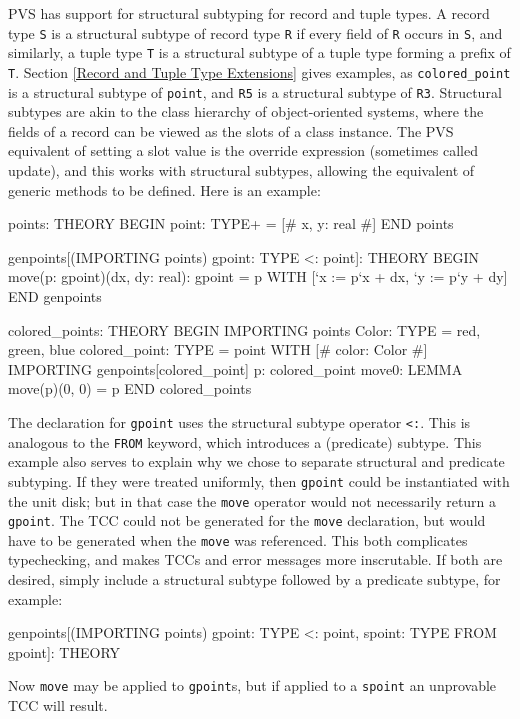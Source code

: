 PVS has support for structural subtyping for record and tuple types.  A
record type \texttt{S} is a structural subtype of record type \texttt{R}
if every field of \texttt{R} occurs in \texttt{S}, and similarly, a tuple
type \texttt{T} is a structural subtype of a tuple type forming a prefix
of \texttt{T}.  Section \ref{Record and Tuple Type Extensions} gives
examples, as \texttt{colored\_point} is a structural subtype of
\texttt{point}, and \texttt{R5} is a structural subtype of \texttt{R3}.
Structural subtypes are akin to the class hierarchy of object-oriented
systems, where the fields of a record can be viewed as the slots of a
class instance.  The PVS equivalent of setting a slot value is the
override expression (sometimes called update), and this works with
structural subtypes, allowing the equivalent of generic methods to be
defined.  Here is an example:
\begin{pvsex}
points: THEORY
BEGIN
 point: TYPE+ = [# x, y: real #]
END points

genpoints[(IMPORTING points) gpoint: TYPE <: point]: THEORY
BEGIN
 move(p: gpoint)(dx, dy: real): gpoint =
  p WITH [`x := p`x + dx, `y := p`y + dy]
END genpoints

colored_points: THEORY
BEGIN
 IMPORTING points
 Color: TYPE = {red, green, blue}
 colored_point: TYPE = point WITH [# color: Color #]
 IMPORTING genpoints[colored_point]
 p: colored_point
 move0: LEMMA move(p)(0, 0) = p
END colored_points
\end{pvsex}

The declaration for \texttt{gpoint} uses the structural subtype operator
\texttt{<:}.  This is analogous to the \texttt{FROM} keyword, which
introduces a (predicate) subtype.  This example also serves to explain
why we chose to separate structural and predicate subtyping.  If they
were treated uniformly, then \texttt{gpoint} could be instantiated with
the unit disk; but in that case the \texttt{move} operator would not
necessarily return a \texttt{gpoint}.  The TCC could not be generated
for the \texttt{move} declaration, but would have to be generated when
the \texttt{move} was referenced.  This both complicates typechecking,
and makes TCCs and error messages more inscrutable.  If both are
desired, simply include a structural subtype followed by a predicate
subtype, for example:
\begin{pvsex}
genpoints[(IMPORTING points) gpoint: TYPE <: point,
          spoint: TYPE FROM gpoint]: THEORY
\end{pvsex}
Now \texttt{move} may be applied to \texttt{gpoint}s, but if applied to a
\texttt{spoint} an unprovable TCC will result.

